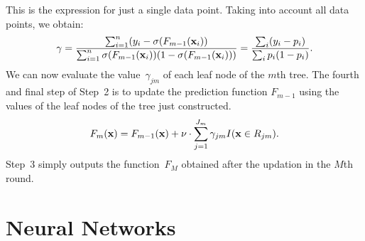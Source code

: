 This is the expression for just a single data point. Taking into account all data points, 
we obtain:
\begin{equation}
\label{eqn:leaf_value}
    \gamma = \frac{\sum_{i = 1}^{n} (y_i - \sigma(F_{m - 1}(\mathbf{x}_i))}{\sum_{i = 1}^{n}\sigma(F_{m - 1}(\mathbf{x}_i)) (1 - \sigma(F_{m - 1}(\mathbf{x}_i)))}
           = \frac{\sum_i (y_i - p_i)}{\sum_i p_i (1 - p_i)}.
\end{equation}
We can now evaluate the value~$\gamma_{j m}$ of each leaf node of the $m$th tree.
The fourth and final step of Step~2 is to update the prediction function 
$F_{m - 1}$ using the values of the leaf nodes of the tree just constructed.
\[
    F_{m}(\mathbf{x}) = F_{m - 1}(\mathbf{x}) + 
            \nu \cdot \sum_{j = 1}^{J_m} \gamma_{j m} I(\mathbf{x} \in R_{j m}).
\] 
Step~3 simply outputs the function~$F_{M}$ obtained after the updation in the 
$M$th round.

\chapter{Neural Networks}

